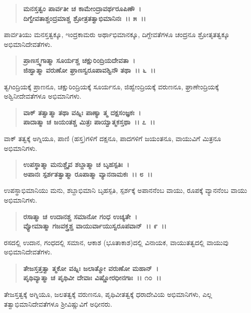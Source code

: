 \begin{verse}
\textbf{ಮನಸ್ತತ್ವಂ ಪಾರ್ವತೀ ಚ ಕಾಮೇಂದ್ರಾವರ್ಥರೂಪಿಣೌ~।}\\\textbf{ದಿಗ್ವೇವತಾಶ್ಚಂದ್ರಮಾಶ್ಚ ಶ್ರೋತ್ರತತ್ವಾಭಿಮಾನಿನಃ~।। ೫~।।}
\end{verse}

ಪಾರ್ವತಿಯು ಮನಸ್ತತ್ವಕ್ಕೂ, ಇಂದ್ರಕಾಮರು ಅರ್ಥಾಭಿಮಾನಕ್ಕೂ, ದಿಗ್ದೇವತೆಗಳೂ ಚಂದ್ರನೂ ಶ್ರೋತೃತತ್ವಕ್ಕೂ ಅಭಿಮಾನಿದೇವತೆಗಳು.

\begin{verse}
\textbf{ಪ್ರಾಣಸ್ತ್ವಗಾತ್ಮಾ ಸೂರ್ಯಶ್ಚ ಚಕ್ಷುರಿಂದ್ರಿಯದೇವತಾ~।}\\\textbf{ಜಿಹ್ವಾತ್ಮಾ ವರುಣೋ ಘ್ರಾಣಸ್ವರೂಪಾವಶ್ವಿನೌ ತಥಾ~।। ೬~।।}
\end{verse}

ತ್ವಗಿಂದ್ರಿಯಕ್ಕೆ ಪ್ರಾಣನೂ, ಚಕ್ಷುರಿಂದ್ರಿಯಕ್ಕೆ ಸೂರ್ಯನೂ, ಜಿಹ್ವೇಂದ್ರಿಯಕ್ಕೆ \break ವರುಣನೂ, ಘ್ರಾಣೇಂದ್ರಿಯಕ್ಕೆ ಅಶ್ವಿನೀದೇವತೆಗಳೂ ಅಭಿಮಾನಿಗಳು.

\begin{verse}
\textbf{ವಾಕ್ ತತ್ವಾತ್ಮಾ ತಥಾ ವಹ್ನಿಃ ಪಾಣ್ಯಾ ತ್ಮ ದಕ್ಷಸಂಜ್ಞಕಃ~।}\\\textbf{ಪಾದಾತ್ಮಾ ಚ ಜಯಂತಶ್ಚ ಮಿತ್ರಃ ಪಾಯ್ವಾತ್ಮಕಸ್ತಥಾ~।। ೭~।।}
\end{verse}

ವಾಕ್ ತತ್ವಕ್ಕೆ ಅಗ್ನಿಯೂ, ಪಾಣಿ (ಹಸ್ತ)ಗಳಿಗೆ ದಕ್ಷನೂ, ಪಾದಗಳಿಗೆ ಜಯಂತನೂ, ವಾಯುವಿಗೆ ಮಿತ್ರನೂ ಅಭಿಮಾನಿಗಳು.

\begin{verse}
\textbf{ಉಪಸ್ಥಾತ್ಮಾ ಮನುಶ್ಚೈವ ಶಬ್ದಾತ್ಮಾ ಚ ಬೃಹಸ್ಪತಿಃ~।}\\\textbf{ಅಪಾನಃ ಸ್ಪರ್ಶತತ್ವಾತ್ಮಾ ರೂಪಾತ್ಮಾ ವ್ಯಾನನಾಮಕಃ~।। ೮~।।}
\end{verse}

ಉಪಸ್ಥಾಭಿಮಾನಿಯು ಮನು, ಶಬ್ದಾಭಿಮಾನಿ ಬೃಹಸ್ಪತಿ, ಸ್ಪರ್ಶಕ್ಕೆ ಅಪಾನನೆಂಬ ವಾಯು, ರೂಪಕ್ಕೆ ವ್ಯಾನನೆಂಬ ವಾಯು ಅಭಿಮಾನಿಗಳು.

\begin{verse}
\textbf{ರಸಾತ್ಮಾ ಚ ಉದಾನಶ್ಚ ಸಮಾನೋ ಗಂಧ ಉಚ್ಯತೇ~।}\\\textbf{ವ್ಯೋಮಾತ್ಮಾ ಗಜವಕ್ತ್ರಶ್ಚ ವಾಯುರ್ವಾಯುಸ್ವರೂಪವಾನ್~।। ೯~।।}
\end{verse}

ರಸದಲ್ಲಿ ಉದಾನ, ಗಂಧದಲ್ಲಿ ಸಮಾನ, ಆಕಾಶ (ಭೂತಾಕಾಶ)ದಲ್ಲಿ ವಿನಾಯಕ, ವಾಯುತತ್ವದಲ್ಲಿ ವಾಯುವು ಅಭಿಮಾನಿದೇವತೆಗಳು.

\begin{verse}
\textbf{ತೇಜಸ್ತತ್ತತ್ವಾ ತ್ಮಕೋ ವಹ್ನಿಃ ಜಲಾತ್ಮೋ ವರುಣೋ ಮಹಾನ್~।}\\\textbf{ಪೃಥಿವ್ಯಾತ್ಮಾ ಚ ಪೃಥಿವೀ ದೇವಾಃ ವಿಷ್ಣೋರಧೀನಗಾಃ~।। ೧೦~।।}
\end{verse}

ತೇಜಸ್ತತ್ವಕ್ಕೆ ಅಗ್ನಿಯೂ, ಜಲತತ್ವಕ್ಕೆ ವರುಣನೂ, ಪೃಥಿವೀತತ್ವಕ್ಕೆ ಧರಾದೇವಿಯ ಅಭಿಮಾನಿಗಳು, ಎಲ್ಲ ತತ್ವಾಭಿಮಾನಿದೇವತೆಗಳೂ ಶ‍್ರೀವಿಷ್ಣುವಿಗೆ ಅಧೀನರು.

